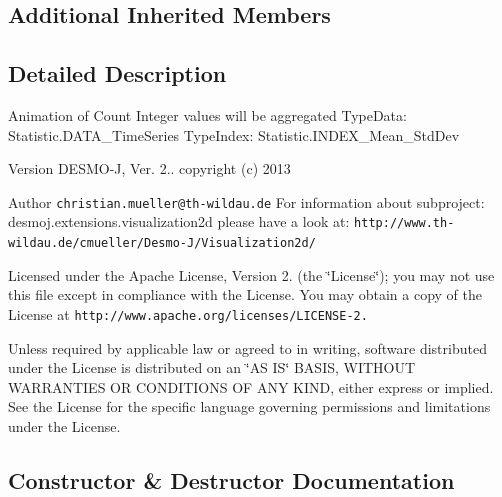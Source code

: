 \subsection*{Additional Inherited Members}


\subsection{Detailed Description}
Animation of Count Integer values will be aggregated Type\-Data\-: Statistic.\-D\-A\-T\-A\-\_\-\-Time\-Series Type\-Index\-: Statistic.\-I\-N\-D\-E\-X\-\_\-\-Mean\-\_\-\-Std\-Dev

\begin{DoxyVersion}{Version}
D\-E\-S\-M\-O-\/\-J, Ver. 2.. copyright (c) 2013 
\end{DoxyVersion}
\begin{DoxyAuthor}{Author}
{\tt christian.\-mueller@th-\/wildau.\-de} For information about subproject\-: desmoj.\-extensions.\-visualization2d please have a look at\-: {\tt http\-://www.\-th-\/wildau.\-de/cmueller/\-Desmo-\/\-J/\-Visualization2d/}
\end{DoxyAuthor}
Licensed under the Apache License, Version 2. (the \char`\"{}\-License\char`\"{}); you may not use this file except in compliance with the License. You may obtain a copy of the License at {\tt http\-://www.\-apache.\-org/licenses/\-L\-I\-C\-E\-N\-S\-E-\/2.}

Unless required by applicable law or agreed to in writing, software distributed under the License is distributed on an \char`\"{}\-A\-S I\-S\char`\"{} B\-A\-S\-I\-S, W\-I\-T\-H\-O\-U\-T W\-A\-R\-R\-A\-N\-T\-I\-E\-S O\-R C\-O\-N\-D\-I\-T\-I\-O\-N\-S O\-F A\-N\-Y K\-I\-N\-D, either express or implied. See the License for the specific language governing permissions and limitations under the License. 

\subsection{Constructor \& Destructor Documentation}
